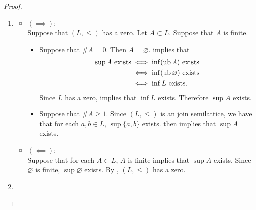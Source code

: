 \documentclass{book}
\begin{document}
	\begin{proof}\
		\begin{enumerate}
			\item 
			\begin{itemize}
				\item $(\implies)$: \\
				Suppose that $(L, \leq)$ has a zero. Let $A \subset L$. Suppose that $A$ is finite.
				\begin{itemize}
					\item Suppose that $\# A = 0$. Then $A = \varnothing$.  implies that
					\begin{align*}
						\text{$\sup A$ exists} 
						& \iff \text{$\inf (\operatorname{ub} A)$ exists} \\
						& \iff \text{$\inf (\operatorname{ub} \varnothing)$ exists} \\
						& \iff \text{$\inf L$ exists}.
					\end{align*}
					Since $L$ has a zero,  implies that $\inf L$ exists. Therefore $\sup A$ exists.
					\item Suppose that $\# A \geq 1$. Since $(L, \leq)$ is an join semilattice, we have that for each $a,b \in L$, $\sup \{a, b\}$ exists.  then implies that $\sup A$ exists. 
				\end{itemize}
				\item $(\impliedby)$: \\
				Suppose that for each $A \subset L$, $A$ is finite implies that $\sup A$ exists. Since $\varnothing$ is finite, $\sup \varnothing$ exists. By , $(L, \leq)$ has a zero. 
			\end{itemize}
			\item {}
		\end{enumerate}
	\end{proof}
	
	
	
	
	
	
	
	
	
	
	
	
	
	
	
	
	
	
	
	
	
	
	
	
	
\end{document}
